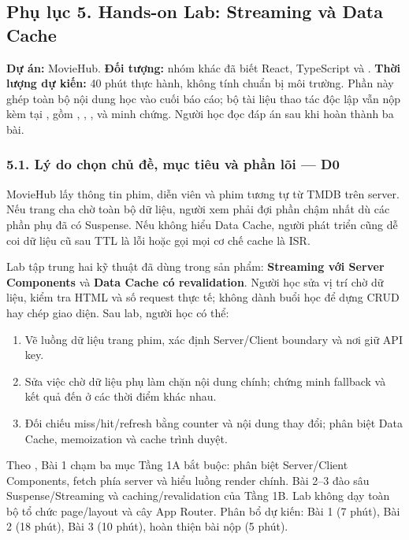\documentclass[12pt,a4paper]{extarticle}
\renewcommand{\thetable}{\arabic{section}.\arabic{table}}
\renewcommand{\thefigure}{\arabic{section}.\arabic{figure}}
\begin{document}
\clearpage
{}
\subsection*{Phụ lục 5. Hands-on Lab: Streaming và Data Cache}
\label{app:hands_on_lab}
\begingroup
\renewcommand{\thetable}{PL5.\arabic{table}}
\renewcommand{\thefigure}{PL5.\arabic{figure}}
\setcounter{table}{0}
\setcounter{figure}{0}

\textbf{Dự án:} MovieHub. \textbf{Đối tượng:} nhóm khác đã biết React, TypeScript và . \textbf{Thời lượng dự kiến:} 40 phút thực hành, không tính chuẩn bị môi trường. Phần này ghép toàn bộ nội dung học vào cuối báo cáo; bộ tài liệu thao tác độc lập vẫn nộp kèm tại , gồm , , ,  và minh chứng. Người học đọc đáp án sau khi hoàn thành ba bài.

\subsubsection*{5.1. Lý do chọn chủ đề, mục tiêu và phần lõi — D0}
MovieHub lấy thông tin phim, diễn viên và phim tương tự từ TMDB trên server. Nếu trang cha chờ toàn bộ dữ liệu, người xem phải đợi phần chậm nhất dù các phần phụ đã có Suspense. Nếu không hiểu Data Cache, người phát triển cũng dễ coi dữ liệu cũ sau TTL là lỗi hoặc gọi mọi cơ chế cache là ISR.

Lab tập trung hai kỹ thuật đã dùng trong sản phẩm: \textbf{Streaming với Server Components} và \textbf{Data Cache có revalidation}. Người học sửa vị trí chờ dữ liệu, kiểm tra HTML và số request thực tế; không dành buổi học để dựng CRUD hay chép giao diện. Sau lab, người học có thể:
\begin{enumerate}[noitemsep]
    \item Vẽ luồng dữ liệu trang phim, xác định Server/Client boundary và nơi giữ API key.
    \item Sửa việc chờ dữ liệu phụ làm chặn nội dung chính; chứng minh fallback và kết quả đến ở các thời điểm khác nhau.
    \item Đối chiếu miss/hit/refresh bằng counter và nội dung thay đổi; phân biệt Data Cache, memoization và cache trình duyệt.
\end{enumerate}
Theo , Bài 1 chạm ba mục Tầng 1A bắt buộc: phân biệt Server/Client Components, fetch phía server và hiểu luồng render chính. Bài 2--3 đào sâu Suspense/Streaming và caching/revalidation của Tầng 1B. Lab không dạy toàn bộ tổ chức page/layout và cây App Router. Phân bổ dự kiến: Bài 1 (7 phút), Bài 2 (18 phút), Bài 3 (10 phút), hoàn thiện bài nộp (5 phút).
\end{document}
